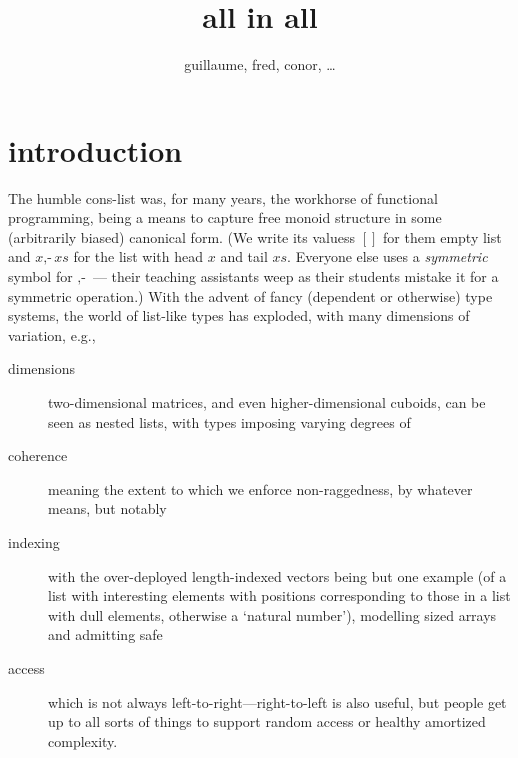 \documentclass{article}
\begin{document}
\title{all in all}
\author{guillaume, fred, conor, \ldots}
\maketitle

\newcommand{\nil}{[]}
\newcommand{\cons}{\mbox{$,\!\textrm{-}$}}
\newcommand{\xs}{\mathit{xs}}
\newcommand{\ys}{\mathit{ys}}
\newcommand{\ps}{\mathit{ps}}
\newcommand{\qs}{\mathit{qs}}
\newcommand{\rs}{\mathit{rs}}
\newcommand{\D}{\mathbf}
\newcommand{\Ty}{\mathbf{Ty}}
\newcommand{\Li}{\D{List}}
\newcommand{\All}{\D{All}}
\newcommand{\Alll}{\D{Alll}}
\newcommand{\ListR}{\D{ListR}}
\newcommand{\Matrix}{\D{Matrix}}
\newcommand{\IF}{\;\Leftarrow\;}
\newcommand{\hb}{\!:\!}
\newcommand{\ma}{\mathbf{map}}
\newcommand{\fst}{\mathbf{fst}}
\newcommand{\sel}{\downharpoonleft}
\newcommand{\emp}{\varepsilon}

\section{introduction}

The humble cons-list was, for many years, the workhorse of functional programming, being a means to capture free monoid structure in some (arbitrarily biased) canonical form. (We write its valuess $\nil$ for them empty list and $x\cons\xs$ for the list with head $x$ and tail $\xs$. Everyone else uses a \emph{symmetric} symbol for $\cons$ --- their teaching assistants weep as their students mistake it for a symmetric operation.) With the advent of fancy (dependent or otherwise) type systems, the world of list-like types has exploded, with many dimensions of variation, e.g.,
\begin{description}
\item[dimensions] two-dimensional matrices, and even higher-dimensional cuboids, can be seen as nested lists, with types imposing varying degrees of
\item[coherence] meaning the extent to which we enforce non-raggedness, by whatever means, but notably
\item[indexing] with the over-deployed length-indexed vectors being but one example (of a list with interesting elements with positions corresponding to those in a list with dull elements, otherwise a `natural number'), modelling sized arrays and admitting safe
\item[access] which is not always left-to-right---right-to-left is also useful, but people get up to all sorts of things to support random access or healthy amortized complexity.
\end{description}
\end{document}
